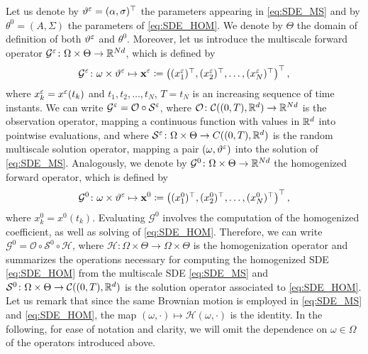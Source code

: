 \documentclass[10pt]{article}
\begin{document}
Let us denote by $\vartheta^\varepsilon = (\alpha, \sigma)^\top$ the parameters appearing in \eqref{eq:SDE_MS} and by $\theta^0 = (A, \Sigma)$ the parameters of \eqref{eq:SDE_HOM}. We denote by $\Theta$ the domain of definition of both $\vartheta^\varepsilon$ and $\theta^0$. Moreover, let us introduce the multiscale forward operator $\mathcal G^\varepsilon \colon \Omega \times \Theta \to \mathbb{R}^{Nd}$, which is defined by
\begin{equation}
	\mathcal G^\varepsilon \colon \omega \times \vartheta^\varepsilon \mapsto \mathbf x^\varepsilon \coloneqq \begin{pmatrix}(x^\varepsilon_1)^\top, (x^\varepsilon_2)^\top, \ldots, (x^\varepsilon_N)^\top \end{pmatrix}^\top,
\end{equation}
where $x_k^\varepsilon = x^\varepsilon(t_k)$ and $t_1, t_2, \ldots, t_N$, $T = t_N$ is an increasing sequence of time instants. We can write $\mathcal G^\varepsilon = \mathcal O \circ \mathcal S^\varepsilon$, where $\mathcal O\colon \mathcal C((0, T), \mathbb{R}^d) \to \mathbb{R}^{Nd}$ is the observation operator, mapping a continuous function with values in $\mathbb{R}^d$ into pointwise evaluations, and where $\mathcal S^\varepsilon \colon \Omega \times \Theta \to C((0, T), \mathbb{R}^d)$ is the random multiscale solution operator, mapping a pair $(\omega, \vartheta^\varepsilon)$ into the solution of \eqref{eq:SDE_MS}. Analogously, we denote by $\mathcal G^0 \colon \Omega \times \Theta \to \mathbb{R}^{Nd}$ the homogenized forward operator, which is defined by
\begin{equation}
	\mathcal G^0 \colon \omega \times \vartheta^\varepsilon \mapsto \mathbf x^0 \coloneqq \begin{pmatrix}(x^0_1)^\top, (x^0_2)^\top, \ldots, (x^0_N)^\top \end{pmatrix}^\top,
\end{equation}
where $x_k^0 = x^0(t_k)$. Evaluating $\mathcal G^0$ involves the computation of the homogenized coefficient, as well as solving of \eqref{eq:SDE_HOM}. Therefore, we can write $\mathcal G^0 = \mathcal O \circ \mathcal S^0 \circ \mathcal H$, where $\mathcal H \colon \Omega \times \Theta \to \Omega \times \Theta$ is the homogenization operator and summarizes the operations necessary for computing the homogenized SDE \eqref{eq:SDE_HOM} from the multiscale SDE \eqref{eq:SDE_MS} and $\mathcal S^0\colon \Omega \times \Theta \to \mathcal C((0, T), \mathbb{R}^d)$ is the solution operator associated to \eqref{eq:SDE_HOM}. Let us remark that since the same Brownian motion is employed in \eqref{eq:SDE_MS} and \eqref{eq:SDE_HOM}, the map $(\omega, \cdot) \mapsto \mathcal H(\omega, \cdot)$ is the identity. In the following, for ease of notation and clarity, we will omit the dependence on $\omega \in \Omega$ of the operators introduced above.
\end{document}
